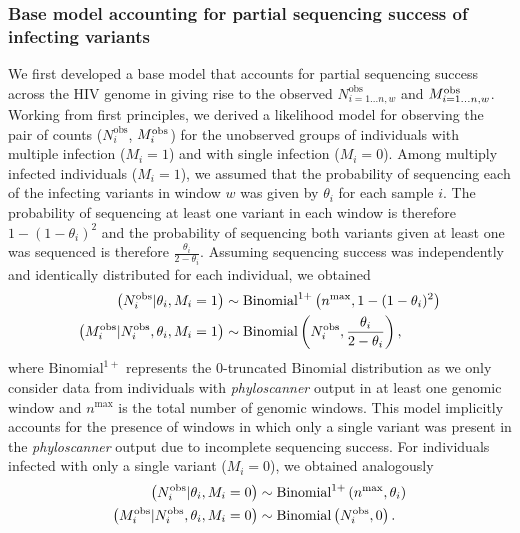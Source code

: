 \documentclass[10pt,letterpaper]{article}
\newcommand{\MI}{M^{\text{\text{obs}}}}
\begin{document}
\subsubsection{Base model accounting for partial sequencing success of infecting variants}
\label{sec:base_model}
We first developed a base model that accounts for partial sequencing success across the HIV genome in giving rise to the observed $N^{\text{obs}}_{i=1...n,w}$ and $\MI_{i=1...n,w}$. Working from first principles, we derived a likelihood model for observing the pair of counts ($N^{\text{obs}}_{i}$, $\MI_i$) for the unobserved groups of individuals with multiple infection ($M_i = 1$) and with single infection ($M_i = 0$). Among multiply infected individuals ($M_i = 1$), we assumed that the probability of sequencing each of the infecting variants in window $w$ was given by $\theta_i$ for each sample $i$. The probability of sequencing at least one variant in each window is therefore $1 - (1-\theta_i)^2$ and the probability of sequencing both variants given at least one was sequenced is therefore $\frac{\theta_i}{2-\theta_i}$. Assuming sequencing success was independently and identically distributed for each individual, we obtained
\begin{subequations}
    \begin{align}
    \left(N^{\text{obs}}_i|\theta_i, M_i = 1\right) & \sim \text{Binomial}^{1+}\left(n^{\text{max}}, 1-(1-\theta_i)^2\right)\\ 
    \left(\MI_i|N^{\text{obs}}_i, \theta_i, M_i = 1\right) & \sim \text{Binomial}\left(N^{\text{obs}}_i, \frac{\theta_i}{2-\theta_i}\right),
    \end{align} \label{eq:base-bin-ni-m1} 
\end{subequations}
where $\text{Binomial}^{1+}$ represents the 0-truncated $\text{Binomial}$ distribution as we only consider data from individuals with \textit{phyloscanner} output in at least one genomic window and $n^{\text{max}}$ is the total number of genomic windows. This model implicitly accounts for the presence of windows in which only a single variant was present in the \textit{phyloscanner} output due to incomplete sequencing success. For individuals infected with only a single variant ($M_i = 0$), we obtained analogously 
\begin{subequations}
    \begin{align}
    \left(N_i^{\text{obs}}|\theta_i, M_i = 0\right) & \sim \text{Binomial}^{1+}\left({n^{\text{max}}}, \theta_i\right)\\ \label{eq:base-bin-ni-m0}
    \left(\MI_i|N^{\text{obs}}_i, \theta_i, M_i = 0\right) &\sim \text{Binomial}\left(N^{\text{obs}}_i, 0\right).
\end{align}
\end{subequations}
\end{document}
